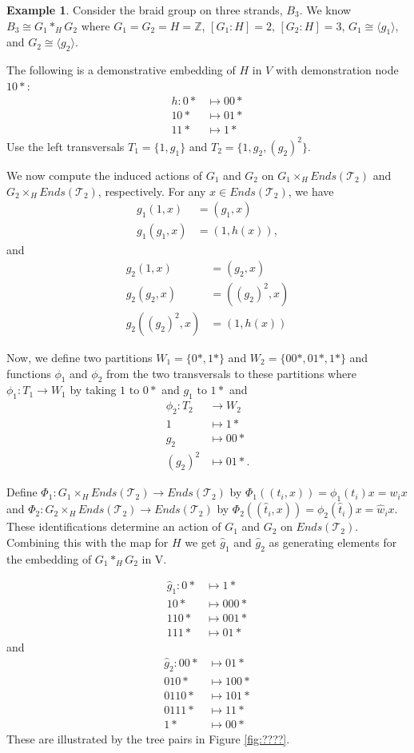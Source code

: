 \documentclass[11pt]{amsart}
\theoremstyle{plain}
\theoremstyle{remark}
\theoremstyle{definition}
\newtheorem{example}[theorem]{Example}
\theoremstyle{remark}
\theoremstyle{named}
\begin{document}
\begin{example}
Consider the braid group on three strands, $B_3$. We know $B_3 \cong G_1 *_H G_2$ where $G_1=G_2=H=\mathbb{Z}$, $[G_1:H]=2$, $[G_2:H]=3$, $G_1 \cong \langle g_1 \rangle$, and $G_2 \cong \langle g_2 \rangle$. 

The following is a demonstrative embedding of $H$ in $V$ with demonstration node $10*$:
\begin{align*}
h: 0* &\mapsto 00* \\
10* &\mapsto 01* \\
11* &\mapsto 1*
\end{align*}
Use the left transversals $T_1 = \{1, g_1 \}$ and $T_2 = \{1, g_2, (g_2)^2 \}$. 

We now compute the induced actions of $G_1$ and $G_2$ on $G_1 \times_H Ends(\mathcal{T}_2)$ and $G_2 \times_H Ends(\mathcal{T}_2)$, respectively.
For any $x \in Ends(\mathcal{T}_2)$, we have
\begin{align*}
g_1(1,x) &= (g_1,x)\\
g_1(g_1,x) &= (1,h(x)),
\end{align*}
and
\begin{align*}
g_2(1,x) &= (g_2,x)\\
g_2(g_2,x) &= ((g_2)^2,x)\\
g_2((g_2)^2,x) &=(1,h(x))
\end{align*}

Now, we define two partitions $W_1=\{0*,1*\}$ and $W_2=\{00*,01*,1*\}$ and functions $\phi_1$ and $\phi_2$ from the two transversals to these partitions where $\phi_1: T_1 \to W_1$ by taking $1 \text{ to } 0*$ and $g_1 \text{ to } 1*$ and  
\begin{align*}
\phi_2:T_2 &\to W_2\\
1 &\mapsto 1*\\
g_2 &\mapsto 00*\\
(g_2)^2 &\mapsto 01*.
\end{align*}

Define $\Phi_1: G_1 \times_H Ends(\mathcal{T}_2) \to Ends(\mathcal{T}_2)$ by $\Phi_1((t_i,x)) = \phi_1(t_i)x=w_ix$ and $\Phi_2: G_2 \times_H Ends(\mathcal{T}_2) \to Ends(\mathcal{T}_2)$ by $\Phi_2((\hat{t}_i,x)) = \phi_2(\hat{t}_i)x=\hat{w}_ix$. These identifications determine an action of $G_1$ and $G_2$ on $Ends(\mathcal{T}_2)$. Combining this with the map for $H$ we get $\hat{g}_1$ and $\hat{g}_2$ as generating elements for the embedding of $G_1 *_H G_2$ in V. 

\begin{align*}
\hat{g}_1: 0* &\mapsto 1* \\
10* &\mapsto 000*\\
110* &\mapsto 001*\\
111* &\mapsto 01*
\end{align*}
and 
\begin{align*}
\hat{g}_2: 00* &\mapsto 01*\\
010* &\mapsto 100*\\
0110* &\mapsto 101*\\
0111* &\mapsto 11*\\
1* &\mapsto 00*
\end{align*}
These are illustrated by the tree pairs in Figure \ref{fig:????}. 


\end{example}
\end{document}
